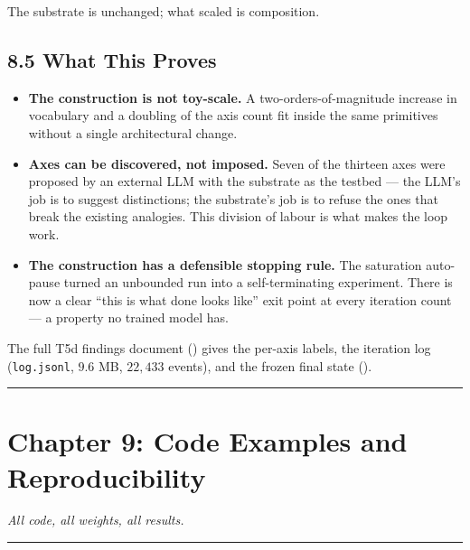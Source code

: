 \documentclass[
  twocolumn,
  10pt,
  a4paper]{article}
\providecommand{\tightlist}{%
  \setlength{\itemsep}{0pt}\setlength{\parskip}{0pt}}
\begin{document}
The substrate is unchanged; what scaled is composition.

\hypertarget{what-this-proves-4}{%
\subsection{8.5 What This Proves}\label{what-this-proves-4}}

\begin{itemize}
\tightlist
\item
  \textbf{The construction is not toy-scale.} A two-orders-of-magnitude
  increase in vocabulary and a doubling of the axis count fit inside the
  same primitives without a single architectural change.
\item
  \textbf{Axes can be discovered, not imposed.} Seven of the thirteen
  axes were proposed by an external LLM with the substrate as the
  testbed --- the LLM's job is to suggest distinctions; the substrate's
  job is to refuse the ones that break the existing analogies. This
  division of labour is what makes the loop work.
\item
  \textbf{The construction has a defensible stopping rule.} The
  saturation auto-pause turned an unbounded run into a self-terminating
  experiment. There is now a clear ``this is what done looks like'' exit
  point at every iteration count --- a property no trained model has.
\end{itemize}

The full T5d findings document (\texttt{})
gives the per-axis labels, the iteration log (\texttt{log.jsonl},
\(9.6\) MB, \(22{,}433\) events), and the frozen final state
(\texttt{}).

\begin{center}\rule{0.5\linewidth}{0.5pt}\end{center}

\hypertarget{chapter-9-code-examples-and-reproducibility}{%
\FloatBarrier
\section{Chapter 9: Code Examples and
Reproducibility}\label{chapter-9-code-examples-and-reproducibility}}

\emph{All code, all weights, all results.}

\begin{center}\rule{0.5\linewidth}{0.5pt}\end{center}
\end{document}
